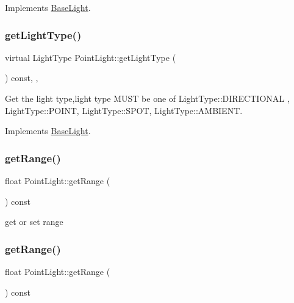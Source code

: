 Implements \hyperlink{classBaseLight_a620db25fed828de7328b83587f388030}{Base\+Light}.

\mbox{\label{classPointLight_aa5747f236903390e8b2834e330b8af61}} 
\subsubsection{\texorpdfstring{get\+Light\+Type()}{getLightType()}\hspace{0.1cm}{\footnotesize\ttfamily [2/2]}}
{\footnotesize\ttfamily virtual Light\+Type Point\+Light\+::get\+Light\+Type (\begin{DoxyParamCaption}{ }\end{DoxyParamCaption}) const\hspace{0.3cm}{\ttfamily [inline]}, {\ttfamily [override]}, {\ttfamily [virtual]}}

Get the light type,light type M\+U\+ST be one of Light\+Type\+::\+D\+I\+R\+E\+C\+T\+I\+O\+N\+AL , Light\+Type\+::\+P\+O\+I\+NT, Light\+Type\+::\+S\+P\+OT, Light\+Type\+::\+A\+M\+B\+I\+E\+NT. 

Implements \hyperlink{classBaseLight_a620db25fed828de7328b83587f388030}{Base\+Light}.

\mbox{\label{classPointLight_adcbefec535c7efa734cb282e2b2161be}} 
\subsubsection{\texorpdfstring{get\+Range()}{getRange()}\hspace{0.1cm}{\footnotesize\ttfamily [1/2]}}
{\footnotesize\ttfamily float Point\+Light\+::get\+Range (\begin{DoxyParamCaption}{ }\end{DoxyParamCaption}) const\hspace{0.3cm}{\ttfamily [inline]}}

get or set range \mbox{\label{classPointLight_adcbefec535c7efa734cb282e2b2161be}} 
\subsubsection{\texorpdfstring{get\+Range()}{getRange()}\hspace{0.1cm}{\footnotesize\ttfamily [2/2]}}
{\footnotesize\ttfamily float Point\+Light\+::get\+Range (\begin{DoxyParamCaption}{ }\end{DoxyParamCaption}) const\hspace{0.3cm}{\ttfamily [inline]}}

